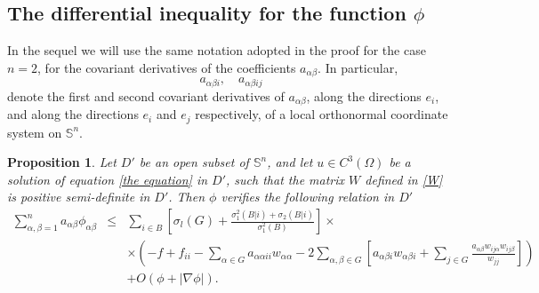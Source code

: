 \documentclass[12pt]{amsart}
\newtheorem{proposition}[theorem]{Proposition}
\newcommand{\1}{\mathbf 1}
\newcommand{\sfe}{{{\mathbb S}^{n}}}
\begin{document}
\subsection{The differential inequality for the function $\phi$}

In the sequel we will use the same notation adopted in the proof for the case $n=2$, for the covariant derivatives of the coefficients $a_{\alpha\beta}$. In particular,
$$
a_{\alpha\beta i},\quad a_{\alpha\beta ij}
$$
denote the first and second covariant derivatives of $a_{\alpha\beta}$, along the directions $e_i$, and along the directions $e_i$ and $e_j$ respectively, of a local orthonormal coordinate system on $\sfe$.

\begin{proposition} Let $D'$ be an open subset of $\mathbb{S}^n$, and let $u\in C^3(\Omega)$ be a solution of equation \eqref{the equation} in $D'$, such that the matrix $W$ defined in \eqref{W} is positive semi-definite in $D'$. Then $\phi$ verifies the following relation in $D'$ 
\begin{eqnarray}\label{equation seven}
\sum_{\alpha,\beta=1}^na_{\alpha\beta}\phi_{\alpha\beta}&\leq &\sum_{i\in B}\left[\sigma_l(G)+\frac{\sigma_{1}^{2}(B|i)+
\sigma_{2}(B|i)}{\sigma_{1}^{2}(B)}\right]\times\\ \nonumber
&&\times\left(-f+f_{ii}
-\sum_{\alpha\in G}a_{\alpha\alpha ii}w_{\alpha\alpha} -
2\sum_{\alpha,\beta\in G}\left[
a_{\alpha\beta i}w_{\alpha\beta i}+\sum_{j\in G}\frac{a_{\alpha\beta}w_{ij\alpha}w_{ij\beta}}{w_{jj}}
\right]\right) \\ \nonumber
&& +O(\phi+|\nabla \phi|).\nonumber
\end{eqnarray}
\end{proposition}
\end{document}
